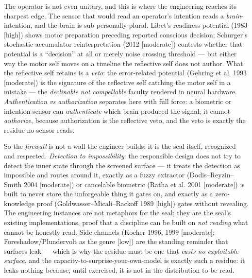 \documentclass[11pt]{article}
\begin{document}
The operator is not even unitary, and this is where the engineering reaches its sharpest edge. The sensor that would read an operator's intention reads a \emph{brain}-intention, and the brain is sub-personally plural. Libet's readiness potential (1983 [high]) shows motor preparation preceding reported conscious decision; Schurger's stochastic-accumulator reinterpretation (2012 [moderate]) contests whether that potential is a ``decision'' at all or merely noise crossing threshold — but either way the motor self moves on a timeline the reflective self does not author. What the reflective self retains is a \emph{veto}: the error-related potential (Gehring et al. 1993 [moderate]) is the signature of the reflective self catching the motor self in a mistake — the \emph{declinable not compellable} faculty rendered in neural hardware. \emph{Authentication vs authorization} separates here with full force: a biometric or intention-sensor can \emph{authenticate} which brain produced the signal; it cannot \emph{authorize}, because authorization is the reflective veto, and the veto is exactly the residue no sensor reads.

So the \emph{firewall} is not a wall the engineer builds; it is the seal itself, recognized and respected. \emph{Detection to impossibility}: the responsible design does not try to detect the inner state through the screened surface — it treats the detection as impossible and routes around it, exactly as a fuzzy extractor (Dodis–Reyzin–Smith 2004 [moderate]) or cancelable biometric (Ratha et al. 2001 [moderate]) is built to never store the unforgeable thing it gates on, and exactly as a zero-knowledge proof (Goldwasser–Micali–Rackoff 1989 [high]) gates without revealing. The engineering instances are not metaphors for the seal; they are the seal's existing implementations, proof that a discipline can be built on \emph{not reading} what cannot be honestly read. Side channels (Kocher 1996, 1999 [moderate]; Foreshadow/\allowbreak{}Plundervolt as the genre [low]) are the standing reminder that surfaces leak — which is why the residue must be one that \emph{casts no exploitable surface}, and the capacity-to-surprise-your-own-model is exactly such a residue: it leaks nothing because, until exercised, it is not in the distribution to be read.
\end{document}
